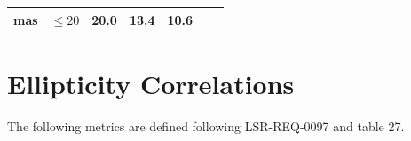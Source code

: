 \documentclass[DM,lsstdraft,toc]{lsstdoc}
\begin{document}
\begin{longtable}[]{@{}lllllll@{}}
\begin{minipage}[t]{0.06\columnwidth}
mas\strut
\end{minipage} & \begin{minipage}[t]{0.14\columnwidth}\raggedright\strut
\(\leq 20\)\strut
\end{minipage} & \begin{minipage}[t]{0.14\columnwidth}\raggedright\strut
20.0\strut
\end{minipage} & \begin{minipage}[t]{0.12\columnwidth}\raggedright\strut
13.4\strut
\end{minipage} & \begin{minipage}[t]{0.12\columnwidth}\raggedright\strut
10.6\strut
\end{minipage} & \begin{minipage}[t]{0.17\columnwidth}\raggedright\strut
\strut
\end{minipage}\tabularnewline
\bottomrule
\end{longtable}

\section{Ellipticity Correlations}\label{ellipticity-correlations}


The following metrics are defined following LSR-REQ-0097
 and  table 27.
\end{document}
